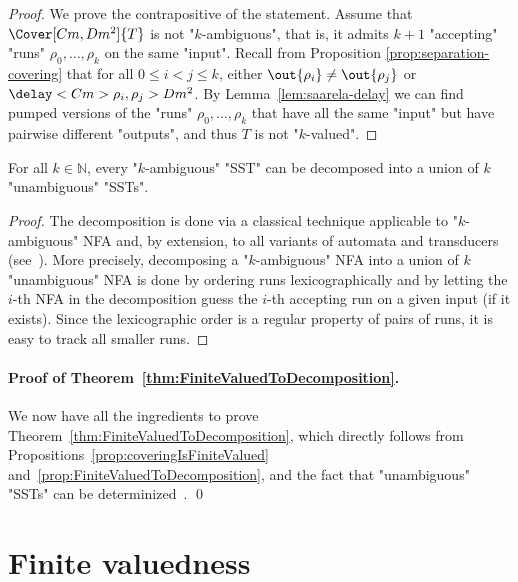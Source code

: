 \documentclass{theoretics}
\begin{document}
\begin{proof}
We prove the contrapositive of the statement. Assume that 
$\Cover[Cm,Dm^2]{T}$ is not "$k$-ambiguous", that is, 
it admits $k+1$ "accepting" "runs" $\rho_0, \dots, \rho_k$ 
on the same "input". 
Recall from Proposition \ref{prop:separation-covering} 
that for all $0\le i<j\le k$, 
either $\out{\rho_i} \neq \out{\rho_j}$ or $\delay<Cm>{\rho_i,\rho_j} > Dm^2$.
By Lemma~\ref{lem:saarela-delay} we can find pumped versions
of the "runs" $\rho_0, \dots, \rho_k$ that have all the same "input" 
but have pairwise different "outputs", and thus $T$ is not "$k$-valued".
\end{proof}


\begin{proposition}\label{prop:FiniteValuedToDecomposition}
For all $k \in \mathbb{N}$, every "$k$-ambiguous" "SST" 
can be decomposed into a union of $k$ "unambiguous" "SSTs".
\end{proposition}

\begin{proof}
The decomposition is done via a classical 
technique applicable to "$k$-ambiguous" NFA and, 
by extension, to all variants of automata and transducers
(see~\cite{JohnsonICALP85,Sakarovitch98}).
More precisely, decomposing a "$k$-ambiguous" NFA into a union of $k$ 
"unambiguous" NFA is done by ordering runs lexicographically 
and by letting the $i$-th NFA in the decomposition guess
the $i$-th accepting run on a given input (if it exists).
Since the lexicographic order is a regular property of pairs of runs,
it is easy to track all smaller runs.
\end{proof}


\paragraph{Proof of Theorem~\ref{thm:FiniteValuedToDecomposition}.} 
We now have all the ingredients to prove
Theorem~\ref{thm:FiniteValuedToDecomposition}, which directly
follows from Propositions~\ref{prop:coveringIsFiniteValued}
and~\ref{prop:FiniteValuedToDecomposition}, and the fact that
"unambiguous" "SSTs" can be determinized~\cite{DBLP:conf/fsttcs/AlurC10}. %
\qed




\section{Finite valuedness}\label{sec:finite-valuedness}
\end{document}
